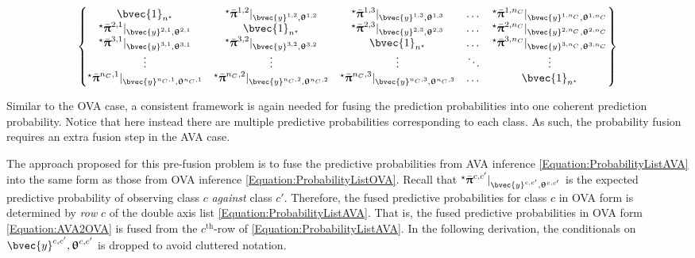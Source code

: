				\begin{equation}
					\begin{Bmatrix*}
						\bvec{1}_{n^{\star}} & {^{\star}}\bar{\vec{\uppi}}^{1, 2} |_{\bvec{y}^{1, 2}, \vec{\uptheta}^{1, 2}} & {^{\star}}\bar{\vec{\uppi}}^{1, 3} |_{\bvec{y}^{1, 3}, \vec{\uptheta}^{1, 3}} & \dots & {^{\star}}\bar{\vec{\uppi}}^{1, n_{C}} |_{\bvec{y}^{1, n_{C}}, \vec{\uptheta}^{1, n_{C}}} \\
						{^{\star}}\bar{\vec{\uppi}}^{2, 1} |_{\bvec{y}^{2, 1}, \vec{\uptheta}^{2, 1}} & \bvec{1}_{n^{\star}} & {^{\star}}\bar{\vec{\uppi}}^{2, 3} |_{\bvec{y}^{2, 3}, \vec{\uptheta}^{2, 3}} & \dots & {^{\star}}\bar{\vec{\uppi}}^{2, n_{C}} |_{\bvec{y}^{2, n_{C}}, \vec{\uptheta}^{2, n_{C}}} \\
						{^{\star}}\bar{\vec{\uppi}}^{3, 1} |_{\bvec{y}^{3, 1}, \vec{\uptheta}^{3, 1}} & {^{\star}}\bar{\vec{\uppi}}^{3, 2} |_{\bvec{y}^{3, 2}, \vec{\uptheta}^{3, 2}} & \bvec{1}_{n^{\star}} & \dots & {^{\star}}\bar{\vec{\uppi}}^{3, n_{C}} |_{\bvec{y}^{3, n_{C}}, \vec{\uptheta}^{3, n_{C}}} \\
						\vdots & \vdots & \vdots & \ddots & \vdots \\
						{^{\star}}\bar{\vec{\uppi}}^{n_{C}, 1} |_{\bvec{y}^{n_{C}, 1}, \vec{\uptheta}^{n_{C}, 1}} & {^{\star}}\bar{\vec{\uppi}}^{n_{C}, 2} |_{\bvec{y}^{n_{C}, 2}, \vec{\uptheta}^{n_{C}, 2}} & {^{\star}}\bar{\vec{\uppi}}^{n_{C}, 3} |_{\bvec{y}^{n_{C}, 3}, \vec{\uptheta}^{n_{C}, 3}} & \dots & \bvec{1}_{n^{\star}}
					\end{Bmatrix*} 
				\label{Equation:ProbabilityListAVA}
				\end{equation}	
				
				Similar to the OVA case, a consistent framework is again needed for fusing the prediction probabilities into one coherent prediction probability. Notice that here instead there are multiple predictive probabilities corresponding to each class. As such, the probability fusion requires an extra fusion step in the AVA case. 
			
				The approach proposed for this pre-fusion problem is to fuse the predictive probabilities from AVA inference \eqref{Equation:ProbabilityListAVA} into the same form as those from OVA inference \eqref{Equation:ProbabilityListOVA}. Recall that ${^{\star}}\bar{\vec{\uppi}}^{c, c'} |_{\bvec{y}^{c, c'}, \vec{\uptheta}^{c, c'}}$ is the expected predictive probability of observing class $c$ \textit{against} class $c'$. Therefore, the fused predictive probabilities for class $c$ in OVA form is determined by \textit{row} $c$ of the double axis list \eqref{Equation:ProbabilityListAVA}. That is, the fused predictive probabilities in OVA form \eqref{Equation:AVA2OVA} is fused from the $c^{\mathrm{th}}$-row of \eqref{Equation:ProbabilityListAVA}. In the following derivation, the conditionals on $\bvec{y}^{c, c'}, \vec{\uptheta}^{c, c'}$ is dropped to avoid cluttered notation.
				
